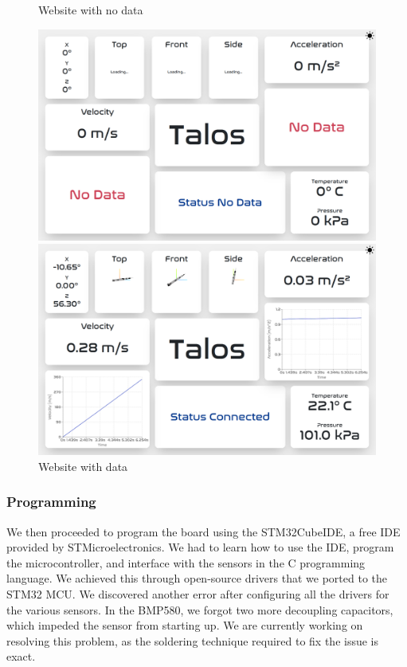 \documentclass{article}
\begin{document}
\begin{figure}[h]
      \caption{Website with no data}
      \label{fig:website_no_data}
      \centering
      \includegraphics[width=\textwidth]{website_no_data.png}
      \caption{Website with data}
      \label{fig:website_data}
      \includegraphics[width=\textwidth]{website_data.png}
\end{figure}
\subsubsection{Programming}
\qquad We then proceeded to program the board using the STM32CubeIDE, a free IDE provided by STMicroelectronics\cite{STM32CubeIDE}. We had to learn how to use the IDE, program the microcontroller, and interface with the sensors in the C programming language. We achieved this through open-source drivers that we ported to the STM32 MCU. We discovered another error after configuring all the drivers for the various sensors. In the BMP580, we forgot two more decoupling capacitors, which impeded the sensor from starting up. We are currently working on resolving this problem, as the soldering technique required to fix the issue is exact.
\end{document}
